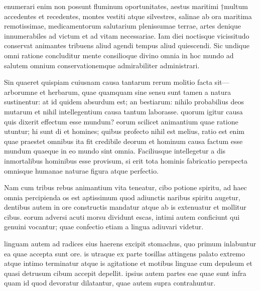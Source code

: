  enumerari enim non possunt fluminum oportunitates, aestus maritimi †multum accedentes et recedentes, montes vestiti atque silvestres, salinae ab ora maritima remotissimae, medicamentorum salutarium plenissumae terrae, artes denique innumerabiles ad victum et ad vitam necessariae. Iam diei noctisque vicissitudo conservat animantes tribuens aliud agendi tempus aliud quiescendi. Sic undique omni ratione concluditur mente consilioque divino omnia in hoc mundo ad salutem omnium conservationemque admirabiliter administrari.

 Sin quaeret quispiam cuiusnam causa tantarum rerum molitio facta sit—arborumne et herbarum, quae quamquam sine sensu sunt tamen a natura sustinentur: at id quidem absurdum est; an bestiarum: nihilo probabilius deos mutarum et nihil intellegentium causa tantum laborasse. quorum igitur causa quis dixerit effectum esse mundum? eorum scilicet animantium quae ratione utuntur; hi sunt di et homines; quibus profecto nihil est melius, ratio est enim quae praestet omnibus ita fit credibile deorum et hominum causa factum esse mundum quaeque in eo mundo sint omnia. Faciliusque intellegetur a dis inmortalibus hominibus esse provisum, si erit tota hominis fabricatio perspecta omnisque humanae naturae figura atque perfectio.

 Nam cum tribus rebus animantium vita teneatur, cibo potione spiritu, ad haec omnia percipienda os est aptissimum quod adiunctis naribus spiritu augetur, dentibus autem in ore constructis mandatur atque ab is extenuatur et mollitur cibus. eorum adversi acuti morsu dividunt escas, intimi autem conficiunt qui genuini vocantur; quae confectio etiam a lingua adiuvari videtur.

 linguam autem ad radices eius haerens excipit stomachus, quo primum inlabuntur ea quae accepta sunt ore. is utraque ex parte tosillas attingens palato extremo atque intimo terminatur atque is agitatione et motibus linguae cum depulsum et quasi detrusum cibum accepit depellit. ipsius autem partes eae quae sunt infra quam id quod devoratur dilatantur, quae autem supra contrahuntur.

